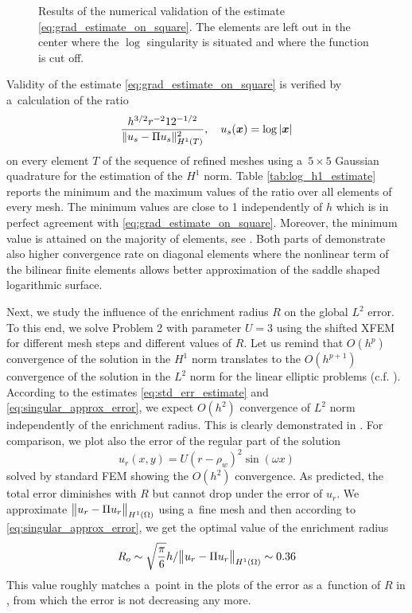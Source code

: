 %
\begin{figure}[!htb]
  \centering    
  \hspace{0pt}
  \caption[Log error estimate.]
  {
  Results of the numerical validation of the estimate \eqref{eq:grad_estimate_on_square}. The elements are left out 
  in the center where the $\log$ singularity is situated and where the function is cut off.
  }
  \label{fig:log_estimate}
\end{figure}
%
Validity of the estimate \eqref{eq:grad_estimate_on_square} is verified by a~calculation of the ratio
\begin{equation} \label{eqn:log_h1_estimate_ratio}
\frac{h^{3/2} r^{-2} 12^{-1/2}}{\|u_s - \Pi u_s\|^2_{H^1(T)}},\quad u_s(\mathbf{\boldsymbol{x}}) = \log \left|\mathbf{\boldsymbol{x}}\right|
\end{equation}
on every element $T$ of the sequence of refined meshes using a~$5\times5$ Gaussian quadrature for the estimation of the $H^1$ norm. Table 
\ref{tab:log_h1_estimate} reports the minimum and the maximum values of the ratio over all elements of every mesh.
The minimum values are close to 1 independently of $h$ which is in perfect agreement with \eqref{eq:grad_estimate_on_square}.
Moreover, the minimum value is attained on the majority of
elements, see . Both parts of  demonstrate also higher convergence rate on diagonal elements
where the nonlinear term of the bilinear finite elements allows better approximation of the saddle shaped logarithmic surface.

Next, we study the influence of the enrichment radius $R$ on the global $L^2$ error. To this end, we solve Problem 2 with parameter $U=3$
using the shifted XFEM for different mesh steps and different values of $R$.
Let us remind that $O(h^p)$ convergence of the solution in the $H^1$ norm translates to the $O(h^{p+1})$ convergence of the solution in the $L^2$ norm 
for the linear elliptic problems (c.f. \cite[Theorem 19.2]{ciarlet_basic_1991}). According to the estimates \eqref{eq:std_err_estimate}
and \eqref{eq:singular_approx_error}, we expect $O(h^2)$ convergence of $L^2$ norm independently of the enrichment radius. This is 
clearly demonstrated in . For comparison, we plot also the error of the regular part of the solution
\[
  u_r(x,y) = U(r-\rho_w)^2 \sin(\omega x)
\]
solved by standard FEM showing the $O(h^2)$ convergence.
As predicted, the total error diminishes with $R$ but cannot 
drop under the error of $u_r$. We approximate $\bigl\Vert u_r - \Pi u_r\bigr\Vert_{H^1(\Omega)}$
using a~fine mesh and then according to \eqref{eq:singular_approx_error},
we get the optimal value of the enrichment radius
\[
    R_o \sim \sqrt{\frac{\pi}{6}} h/\bigl\Vert u_r - \Pi u_r\bigr\Vert_{H^1(\Omega)} \sim 0.36
\]
This value roughly matches a~point in the plots of the error as a~function of $R$ in
, from which the error is not decreasing any more.


